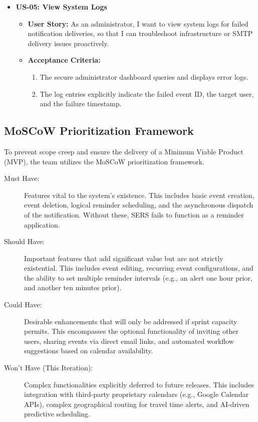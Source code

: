 \begin{itemize}
    \item \textbf{US-05: View System Logs}
          \begin{itemize}
              \item \textbf{User Story:} As an administrator, I want to view system logs for failed notification deliveries, so that I can troubleshoot infrastructure or SMTP delivery issues proactively.
              \item \textbf{Acceptance Criteria:}
                    \begin{enumerate}
                        \item The secure administrator dashboard queries and displays error logs.
                        \item The log entries explicitly indicate the failed event ID, the target user, and the failure timestamp.
                    \end{enumerate}
          \end{itemize}
\end{itemize}

\vspace{1em} %

\subsection{MoSCoW Prioritization Framework}

To prevent scope creep and ensure the delivery of a Minimum Viable Product (MVP), the team utilizes the MoSCoW prioritization framework. %

\begin{description}
    \item[Must Have:] Features vital to the system's existence. This includes basic event creation, event deletion, logical reminder scheduling, and the asynchronous dispatch of the notification. Without these, SERS fails to function as a reminder application. %

    \item[Should Have:] Important features that add significant value but are not strictly existential. This includes event editing, recurring event configurations, and the ability to set multiple reminder intervals (e.g., an alert one hour prior, and another ten minutes prior).

    \item[Could Have:] Desirable enhancements that will only be addressed if sprint capacity permits. This encompasses the optional functionality of inviting other users, sharing events via direct email links, and automated workflow suggestions based on calendar availability.

    \item[Won't Have (This Iteration):] Complex functionalities explicitly deferred to future releases. This includes integration with third-party proprietary calendars (e.g., Google Calendar APIs), complex geographical routing for travel time alerts, and AI-driven predictive scheduling.
\end{description}
